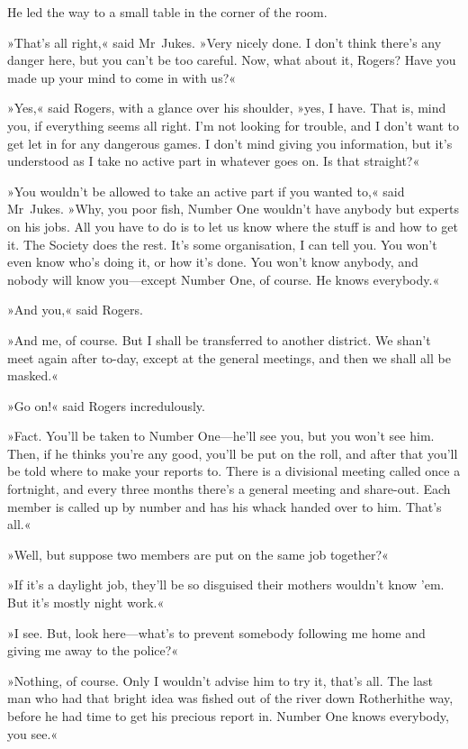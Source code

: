 He led the way to a small table in the corner of the room.

»That's all right,« said Mr~Jukes. »Very nicely done. I don't think there's any danger here, but you can't be too careful. Now, what about it, Rogers? Have you made up your mind to come in with us?«

»Yes,« said Rogers, with a glance over his shoulder, »yes, I have. That is, mind you, if everything seems all right. I'm not looking for trouble, and I don't want to get let in for any dangerous games. I don't mind giving you information, but it's understood as I take no active part in whatever goes on. Is that straight?«

»You wouldn't be allowed to take an active part if you wanted to,« said Mr~Jukes. »Why, you poor fish, Number One wouldn't have anybody but experts on his jobs. All you have to do is to let us know where the stuff is and how to get it. The Society does the rest. It's some organisation, I can tell you. You won't even know who's doing it, or how it's done. You won't know anybody, and nobody will know you—except Number One, of course. He knows everybody.«

»And you,« said Rogers.

»And me, of course. But I shall be transferred to another district. We shan't meet again after to-day, except at the general meetings, and then we shall all be masked.«

»Go on!« said Rogers incredulously.

»Fact. You'll be taken to Number One—he'll see you, but you won't see him. Then, if he thinks you're any good, you'll be put on the roll, and after that you'll be told where to make your reports to. There is a divisional meeting called once a fortnight, and every three months there's a general meeting and share-out. Each member is called up by number and has his whack handed over to him. That's all.«

»Well, but suppose two members are put on the same job together?«

»If it's a daylight job, they'll be so disguised their mothers wouldn't know 'em. But it's mostly night work.«

»I see. But, look here—what's to prevent somebody following me home and giving me away to the police?«

»Nothing, of course. Only I wouldn't advise him to try it, that's all. The last man who had that bright idea was fished out of the river down Rotherhithe way, before he had time to get his precious report in. Number One knows everybody, you see.«

